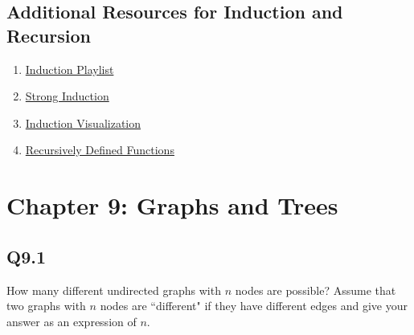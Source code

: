 \documentclass{article}
\begin{document}
\subsection*{Additional Resources for Induction and Recursion}
\begin{enumerate}
    \item \href{https://www.youtube.com/watch?v=IdTaA6iz3Mo&list=PL5KkMZvBpo5CnkA4bi7l6W62VPoYRbOEk&index=1}{Induction Playlist}
    \item \href{https://www.youtube.com/watch?v=-vJhahLdmLI}{Strong Induction}
    \item \href{https://www.youtube.com/watch?v=5Hn8vUE3cBQ}{Induction Visualization}
    \item \href{https://www.youtube.com/watch?v=5RB4H_12wOs}{Recursively Defined Functions}
\end{enumerate}
\newpage
\section*{Chapter 9: Graphs and Trees}

\subsection*{Q9.1}
How many different undirected graphs with $n$ nodes are possible? Assume that two graphs with $n$ nodes are ``different" if they have different edges and give your answer as an expression of $n$.
\newpage
\end{document}
